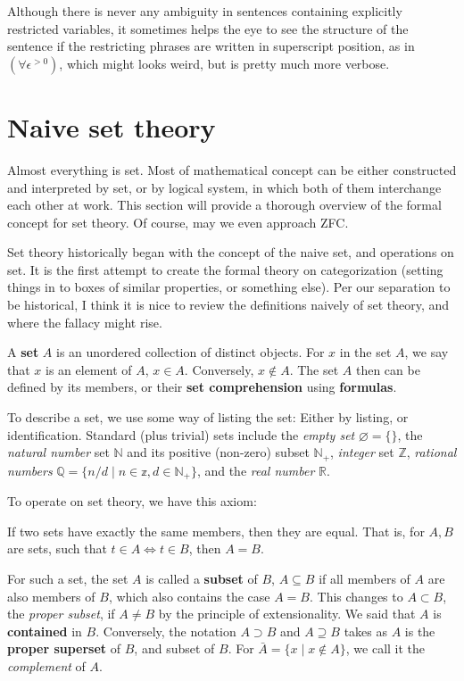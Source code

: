 Although there is never any ambiguity in sentences containing explicitly restricted variables, it sometimes helps the eye to see the structure of the sentence if the restricting phrases are written in superscript position, as in $(\forall \epsilon^{>0})$, which might looks weird, but is pretty much more verbose. 


\section{Naive set theory}

Almost everything is set. Most of mathematical concept can be either constructed and interpreted by set, or by logical system, in which both of them interchange each other at work. This section will provide a thorough overview of the formal concept for set theory. Of course, may we even approach ZFC. 

Set theory historically began with the concept of the naive set, and operations on set. It is the first attempt to create the formal theory on categorization (setting things in to boxes of similar properties, or something else). Per our separation to be historical, I think it is nice to review the definitions naively of set theory, and where the fallacy might rise.
\begin{definition}[Set]
    A \textbf{set} $A$ is an unordered collection of distinct objects. For $x$ in the set $A$, we say that $x$ is an element of $A$, $x\in A$. Conversely, $x\notin A$. The set $A$ then can be defined by its members, or their \textbf{set comprehension} using \textbf{formulas}. 
\end{definition}

To describe a set, we use some way of listing the set: Either by listing, or identification. Standard (plus trivial) sets include the \textit{empty set} $\varnothing = \{\}$, the \textit{natural number} set $\mathbb{N}$ and its positive (non-zero) subset $\mathbb{N}_{+}$, \textit{integer} set $\mathbb{Z}$, \textit{rational numbers} $\mathbb{Q}= \{n/d\mid n\in \mathbb{z}, d\in \mathbb{N}_{+}\}$, and the \textit{real number} $\mathbb{R}$.  

To operate on set theory, we have this axiom: 
\begin{axiom}
    If two sets have exactly the same members, then they are equal. That is, for $A,B$ are sets, such that $t\in A \iff t\in B$, then $A=B$.
\end{axiom}
For such a set, the set $A$ is called a \textbf{subset} of $B$, $A\subseteq B$ if all members of $A$ are also members of $B$, which also contains the case $A=B$. This changes to $A\subset B$, the \textit{proper subset}, if $A\neq B$ by the principle of extensionality. We said that $A$ is \textbf{contained} in $B$. Conversely, the notation $A\supset B$ and $A\supseteq B$ takes as $A$ is the \textbf{proper superset} of $B$, and subset of $B$. For $\bar{A}=\{x\mid x\not\in A\}$, we call it the \textit{complement} of $A$. 

